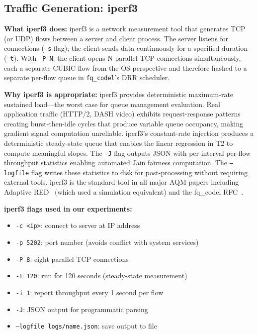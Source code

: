 \documentclass[conference]{IEEEtran}
\begin{document}
\subsection{Traffic Generation: iperf3}

\textbf{What iperf3 does:} iperf3 is a network measurement tool that generates
TCP (or UDP) flows between a server and client process. The server listens for
connections (\texttt{-s} flag); the client sends data continuously for a
specified duration (\texttt{-t}). With \texttt{-P N}, the client opens N
parallel TCP connections simultaneously, each a separate CUBIC flow from the
OS perspective and therefore hashed to a separate per-flow queue in
\texttt{fq\_codel}'s DRR scheduler.

\textbf{Why iperf3 is appropriate:} iperf3 provides deterministic maximum-rate
sustained load---the worst case for queue management evaluation. Real
application traffic (HTTP/2, DASH video) exhibits request-response patterns
creating burst-then-idle cycles that produce variable queue occupancy, making
gradient signal computation unreliable. iperf3's constant-rate injection produces
a deterministic steady-state queue that enables the linear regression in T2 to
compute meaningful slopes. The \texttt{-J} flag outputs JSON with per-interval
per-flow throughput statistics enabling automated Jain fairness computation.
The \texttt{--logfile} flag writes these statistics to disk for post-processing
without requiring external tools. iperf3 is the standard tool in all major AQM
papers including Adaptive RED~\cite{ared2001} (which used a simulation
equivalent) and the fq\_codel RFC~\cite{rfc8290}.

\textbf{iperf3 flags used in our experiments:}
\begin{itemize}
\item \texttt{-c <ip>}: connect to server at IP address
\item \texttt{-p 5202}: port number (avoids conflict with system services)
\item \texttt{-P 8}: eight parallel TCP connections
\item \texttt{-t 120}: run for 120 seconds (steady-state measurement)
\item \texttt{-i 1}: report throughput every 1 second per flow
\item \texttt{-J}: JSON output for programmatic parsing
\item \texttt{--logfile logs/name.json}: save output to file
\end{itemize}
\end{document}
